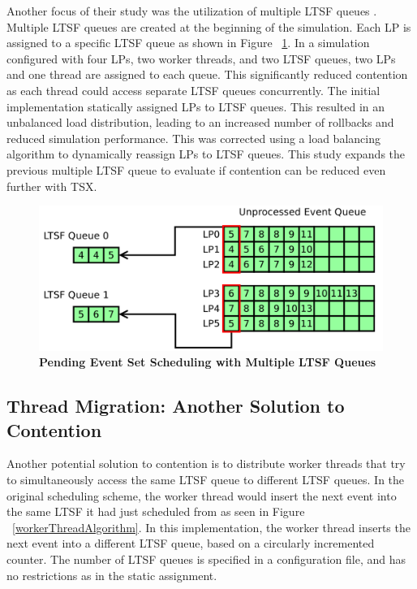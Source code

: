 \documentclass[a4paper]{article}
\begin{document}
Another focus of their study was the utilization of multiple LTSF queues
\cite{dickman}.  Multiple LTSF queues are created at the beginning of the
simulation.  Each LP is assigned to a specific LTSF queue as shown in Figure
~\ref{fig:multipleLTSF}.  In a simulation configured with four LPs, two worker
threads, and two LTSF queues, two LPs and one thread are assigned to each queue.
This significantly reduced contention as each thread could access separate LTSF
queues concurrently.  The initial implementation statically assigned LPs to LTSF
queues.  This resulted in an unbalanced load distribution, leading to an
increased number of rollbacks and reduced simulation performance.  This was
corrected using a load balancing algorithm to dynamically reassign LPs to LTSF
queues.  This study expands the previous multiple LTSF queue to evaluate if
contention can be reduced even further with TSX.
\par

\begin{figure}[H]
    \centering
    \graphicspath{ {./figures/} }
    \includegraphics[width=\textwidth,height=\textheight,keepaspectratio]{multiple_ltsf}
    \caption{\textbf{Pending Event Set Scheduling with Multiple LTSF Queues}}
    \label{fig:multipleLTSF}
\end{figure}

\subsection{\textbf{Thread Migration: Another Solution to Contention}}

Another potential solution to contention is to distribute worker threads that
try to simultaneously access the same LTSF queue to different LTSF queues.
In the original scheduling scheme, the worker thread would insert the next event
into the same LTSF it had just scheduled from as seen in Figure
~\ref{workerThreadAlgorithm}.  In this implementation, the worker thread inserts
the next event into a different LTSF queue, based on a circularly incremented
counter.  The number of LTSF queues is specified in a configuration file, and
has no restrictions as in the static assignment.
\end{document}

